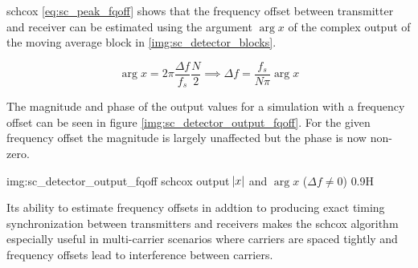 \begin{subchapter}{\acrlong{schcox}}
  \autoref{eq:sc_peak_fqoff} shows that the frequency offset between transmitter
  and receiver can be estimated using the argument $\arg{x}$ of the complex output of the
  moving average block in \autoref{img:sc_detector_blocks}.

  \begin{equation*}
    \arg{x} = 2 \pi \frac{\Delta f}{f_s} \frac{N}{2} \implies \Delta f = \frac{f_s}{N \pi} \arg{x}
  \end{equation*}

  The magnitude and phase of the output values for a simulation with a
  frequency offset can be seen in figure \ref{img:sc_detector_output_fqoff}.
  For the given frequency offset the magnitude is largely unaffected but
  the phase is now non-zero.

               {img:sc_detector_output_fqoff}
               {\acrshort{schcox} output $\abs{x}$ and $\arg{x}$ ($\Delta f \neq 0$)}
               {0.9}{H}
\end{subchapter}

Its ability to estimate frequency offsets in addtion to producing
exact timing synchronization between transmitters and
receivers makes the \acrlong{schcox} algorithm especially useful
in multi-carrier scenarios where carriers are spaced tightly and
frequency offsets lead to interference between carriers.
